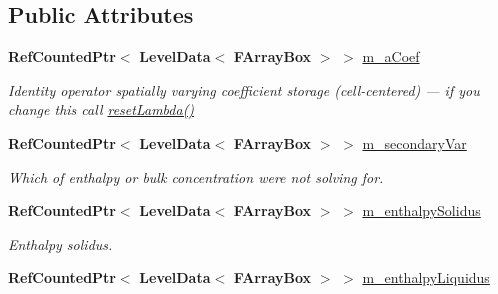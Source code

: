 \subsection*{Public Attributes}
\begin{DoxyCompactItemize}
\item 
\mbox{\label{class_a_m_r_non_linear_multi_comp_op_af95d5785a1c0291dbd7309b1539ab2fb}} 
\textbf{ Ref\+Counted\+Ptr}$<$ \textbf{ Level\+Data}$<$ \textbf{ F\+Array\+Box} $>$ $>$ \hyperlink{class_a_m_r_non_linear_multi_comp_op_af95d5785a1c0291dbd7309b1539ab2fb}{m\+\_\+a\+Coef}
\begin{DoxyCompactList}\small\item\em Identity operator spatially varying coefficient storage (cell-\/centered) --- if you change this call \hyperlink{class_a_m_r_non_linear_multi_comp_op_aa558902d2bd88e41dff404c6b3ae206f}{reset\+Lambda()} \end{DoxyCompactList}\item 
\mbox{\label{class_a_m_r_non_linear_multi_comp_op_a137649e6de11ed5ebf0fd06ed6766e65}} 
\textbf{ Ref\+Counted\+Ptr}$<$ \textbf{ Level\+Data}$<$ \textbf{ F\+Array\+Box} $>$ $>$ \hyperlink{class_a_m_r_non_linear_multi_comp_op_a137649e6de11ed5ebf0fd06ed6766e65}{m\+\_\+secondary\+Var}
\begin{DoxyCompactList}\small\item\em Which of enthalpy or bulk concentration we\textquotesingle{}re not solving for. \end{DoxyCompactList}\item 
\mbox{\label{class_a_m_r_non_linear_multi_comp_op_ad6cea304fd804cbf1c7340a9740ad955}} 
\textbf{ Ref\+Counted\+Ptr}$<$ \textbf{ Level\+Data}$<$ \textbf{ F\+Array\+Box} $>$ $>$ \hyperlink{class_a_m_r_non_linear_multi_comp_op_ad6cea304fd804cbf1c7340a9740ad955}{m\+\_\+enthalpy\+Solidus}
\begin{DoxyCompactList}\small\item\em Enthalpy solidus. \end{DoxyCompactList}\item 
\mbox{\label{class_a_m_r_non_linear_multi_comp_op_a285a99a0a4dcf36cd641f8c46d815873}} 
\textbf{ Ref\+Counted\+Ptr}$<$ \textbf{ Level\+Data}$<$ \textbf{ F\+Array\+Box} $>$ $>$ \hyperlink{class_a_m_r_non_linear_multi_comp_op_a285a99a0a4dcf36cd641f8c46d815873}{m\+\_\+enthalpy\+Liquidus}

\end{DoxyCompactItemize}
